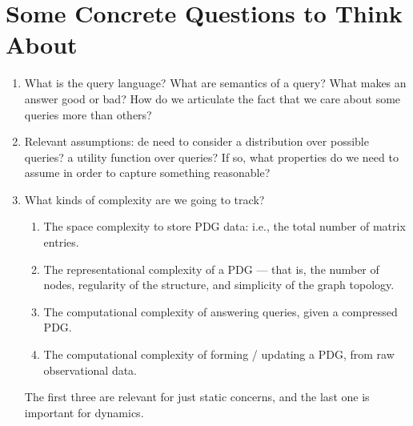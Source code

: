 \documentclass{article}
\theoremstyle{plain}
\theoremstyle{definition}
\theoremstyle{remark}
\newtheorem*{remark}{Remark}
\begin{document}
	
	
	\section{Some Concrete Questions to Think About}
	
	\begin{enumerate}
		\item What is the query language? What are semantics of a query? What makes an answer good or bad? How do we articulate the fact that we care about some queries more than others?
		\item Relevant assumptions: de need to consider a distribution over possible queries? a utility function over queries? If so, what properties do we need to assume in order to capture something reasonable?
		\item What kinds of complexity are we going to track?
		\begin{enumerate}[nosep]
			\item The space complexity to store PDG data: i.e., the total number of matrix entries. 
			\item The representational complexity of a PDG --- that is, the number of nodes, regularity of the structure, and simplicity of the graph topology. 
			\item The computational complexity of answering queries, given a compressed PDG.
			\item The computational complexity of forming / updating a PDG, from raw observational data.
		\end{enumerate}
		The first three are relevant for just static concerns, and the last one is important for dynamics. 
	\end{enumerate}
	
\end{document}

